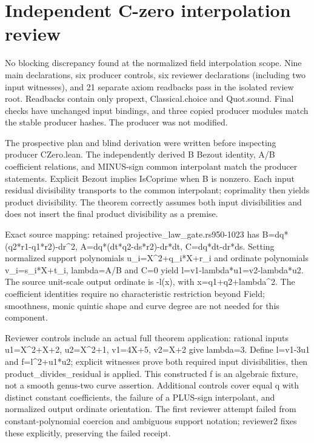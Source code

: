 \documentclass[11pt]{article}
\begin{document}
\sloppy
\section*{Independent C-zero interpolation review}
No blocking discrepancy found at the normalized field interpolation scope. Nine main declarations, six producer controls, six reviewer declarations (including two input witnesses), and 21 separate axiom readbacks pass in the isolated review root. Readbacks contain only propext, Classical.choice and Quot.sound. Final checks have unchanged input bindings, and three copied producer modules match the stable producer hashes. The producer was not modified.\par\medskip
The prospective plan and blind derivation were written before inspecting producer CZero.lean. The independently derived B Bezout identity, A/B coefficient relations, and MINUS-sign common interpolant match the producer statements. Explicit Bezout implies IsCoprime when B is nonzero. Each input residual divisibility transports to the common interpolant; coprimality then yields product divisibility. The theorem correctly assumes both input divisibilities and does not insert the final product divisibility as a premise.\par\medskip
Exact source mapping: retained projective\_law\_gate.rs950-1023 has B=dq*(q2*r1-q1*r2)-dr\textasciicircum{}2, A=dq*(dt*q2-ds*r2)-dr*dt, C=dq*dt-dr*ds. Setting normalized support polynomials u\_i=X\textasciicircum{}2+q\_i*X+r\_i and ordinate polynomials v\_i=s\_i*X+t\_i, lambda=A/B and C=0 yield l=v1-lambda*u1=v2-lambda*u2. The source unit-scale output ordinate is -l(x), with x=q1+q2+lambda\textasciicircum{}2. The coefficient identities require no characteristic restriction beyond Field; smoothness, monic quintic shape and curve degree are not needed for this component.\par\medskip
Reviewer controls include an actual full theorem application: rational inputs u1=X\textasciicircum{}2+X+2, u2=X\textasciicircum{}2+1, v1=4X+5, v2=X+2 give lambda=3. Define l=v1-3u1 and f=l\textasciicircum{}2+u1*u2; explicit witnesses prove both required input divisibilities, then product\_divides\_residual is applied. This constructed f is an algebraic fixture, not a smooth genus-two curve assertion. Additional controls cover equal q with distinct constant coefficients, the failure of a PLUS-sign interpolant, and normalized output ordinate orientation. The first reviewer attempt failed from constant-polynomial coercion and ambiguous support notation; reviewer2 fixes these explicitly, preserving the failed receipt.\par\medskip
\end{document}
